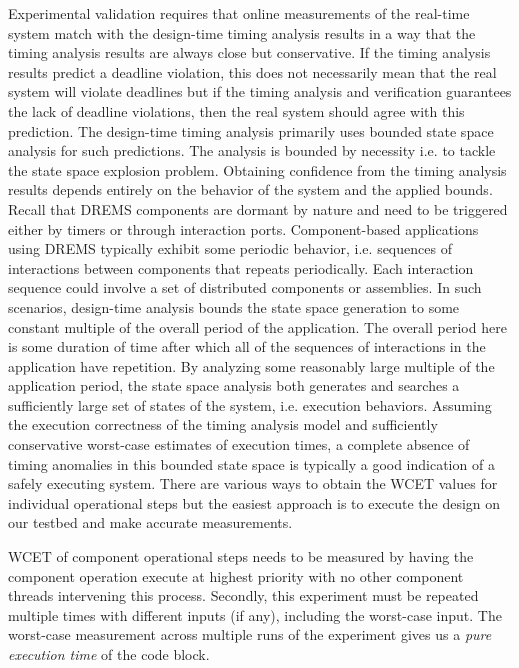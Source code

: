 Experimental validation requires that online measurements of the real-time system match with the design-time timing analysis results in a way that the timing analysis results are always close but conservative. If the timing analysis results predict a deadline violation, this does not necessarily mean that the real system will violate deadlines but if the timing analysis and verification guarantees the lack of deadline violations, then the real system should agree with this prediction. The design-time timing analysis primarily uses bounded state space analysis for such predictions. The analysis is bounded by necessity i.e. to tackle the state space explosion problem. Obtaining confidence from the timing analysis results depends entirely on the behavior of the system and the applied bounds. Recall that DREMS components are dormant by nature and need to be triggered either by timers or through interaction ports. Component-based applications using DREMS typically exhibit some periodic behavior, i.e. sequences of interactions between components that repeats periodically. Each interaction sequence could involve a set of distributed components or assemblies. In such scenarios, design-time analysis bounds the state space generation to some constant multiple of the overall period of the application. The overall period here is some duration of time after which all of the sequences of interactions in the application have repetition. By analyzing some reasonably large multiple of the application period, the state space analysis both generates and searches a sufficiently large set of states of the system, i.e. execution behaviors. Assuming the execution correctness of the timing analysis model and sufficiently conservative worst-case estimates of execution times, a complete absence of timing anomalies in this bounded state space is typically a good indication of a safely executing system. There are various ways to obtain the WCET values for individual operational steps but the easiest approach is to execute the design on our testbed and make accurate measurements.


WCET of component operational steps needs to be measured by having the component operation execute at highest priority with no other component threads intervening this process. Secondly, this experiment must be repeated multiple times with different inputs (if any), including the worst-case input. The worst-case measurement across multiple runs of the experiment gives us a \emph{pure execution time} of the code block. 

